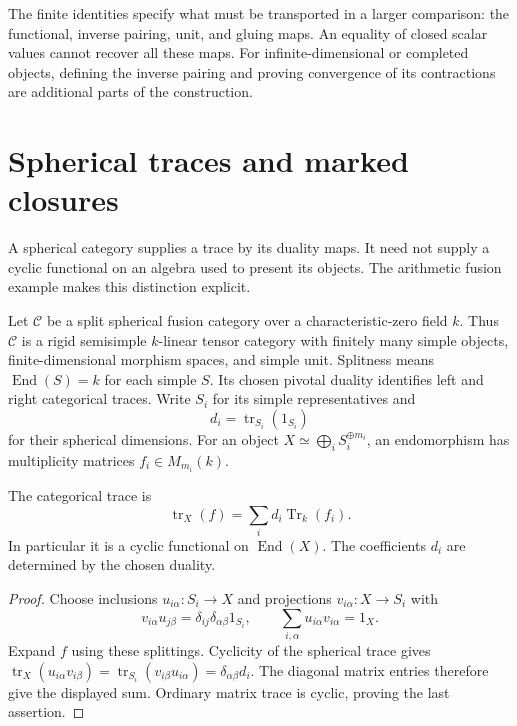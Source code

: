The finite identities specify what must be transported in a larger
comparison: the functional, inverse pairing, unit, and gluing maps. An
equality of closed scalar values cannot recover all these maps. For
infinite-dimensional or completed objects, defining the inverse pairing and
proving convergence of its contractions are additional parts of the
construction.

\section{Spherical traces and marked closures}

A spherical category supplies a trace by its duality maps. It need not
supply a cyclic functional on an algebra used to present its objects. The
arithmetic fusion example makes this distinction explicit.

Let $\mathcal C$ be a split spherical fusion category over a
characteristic-zero field $k$. Thus $\mathcal C$ is a rigid semisimple
$k$-linear tensor category with finitely many simple objects,
finite-dimensional morphism spaces, and simple unit. Splitness means
$\operatorname{End}(S)=k$ for each simple $S$. Its chosen pivotal duality
identifies left and right categorical traces. Write $S_i$ for its simple
representatives and
\[
 d_i=\operatorname{tr}_{S_i}(1_{S_i})
\]
for their spherical dimensions. For an object $X\simeq\bigoplus_i
S_i^{\oplus m_i}$, an endomorphism has multiplicity matrices $f_i\in
M_{m_i}(k)$.

\begin{proposition}
\label{v4-arith:traces:spherical-matrices}
The categorical trace is
\[
 \operatorname{tr}_X(f)=\sum_i d_i\operatorname{Tr}_k(f_i).
\]
In particular it is a cyclic functional on $\operatorname{End}(X)$. The
coefficients $d_i$ are determined by the chosen duality.
\end{proposition}
\begin{proof}
Choose inclusions $u_{i\alpha}:S_i\to X$ and projections $v_{i\alpha}:X\to
S_i$ with
\[
 v_{i\alpha}u_{j\beta}
   =\delta_{ij}\delta_{\alpha\beta}1_{S_i},
 \qquad
 \sum_{i,\alpha}u_{i\alpha}v_{i\alpha}=1_X.
\]
Expand $f$ using these splittings. Cyclicity of the spherical trace gives
$\operatorname{tr}_X(u_{i\alpha}v_{i\beta})
=\operatorname{tr}_{S_i}(v_{i\beta}u_{i\alpha}) =\delta_{\alpha\beta}d_i$.
The diagonal matrix entries therefore give the displayed sum. Ordinary
matrix trace is cyclic, proving the last assertion.
\end{proof}


